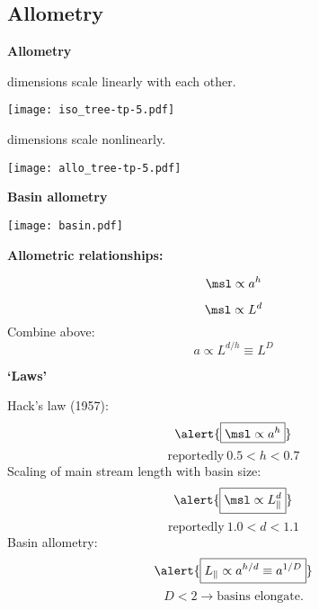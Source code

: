 \begin{frame}[label=]
\begin{frame}[label=]
\begin{frame}[label=]
\begin{frame}[label=]
\begin{frame}[label=]
\subsection{Allometry}

\begin{frame}[label=]
  \textbf{Allometry}


  \bigskip

      
    
    
    
      dimensions scale linearly with each other.
    
    \texttt{[image: iso\_tree-tp-5.pdf]}
    
    
          
      
      
         dimensions scale nonlinearly.
      
      \texttt{[image: allo\_tree-tp-5.pdf]}
        
  




\begin{frame}[label=]
  \textbf{Basin allometry}

      
    \texttt{[image: basin.pdf]}
    
    \textbf{Allometric relationships:}
      
       
        $$\msl \propto a^h$$
       
        $$\msl \propto L^d$$
       Combine above:
        $$ a \propto  L^{d/h} \equiv L^{D}$$
      
    
  
\begin{frame}[label=]
  \textbf{`Laws'}

  
     Hack's law (1957)\cite{hack1957a}:  
    $$ \alert{\boxed{\msl \propto a^h}}$$
    $$ \mbox{reportedly} \ 0.5 < h < 0.7 $$
     Scaling of main stream length with basin size:
    $$ \alert{\boxed{\msl \propto L_\parallel^d}} $$
    $$ \mbox{reportedly} \ 1.0 < d < 1.1 $$
     Basin allometry:
    $$ \alert{\boxed{L_\parallel \propto a^{h/d} \equiv a^{1/D}}}$$
    $$D < 2 \rightarrow \mbox{basins elongate}.$$
  



\end{frame}
\end{frame}
\end{frame}
\end{frame}
\end{frame}
\end{frame}
\end{frame}
\end{frame}
